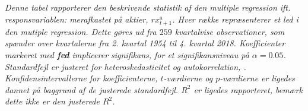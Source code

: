\documentclass[
  a4paper,
  oneside]{memoir}
\begin{document}
\begin{table}[H]
{\begin{threeparttable}
\begin{tabular}[t]{llrrrrrrrr}
\bottomrule
\end{tabular}
\begin{tablenotes}
\item \textit{Denne tabel rapporterer den beskrivende statistik af den multiple regression ift. responsvariablen: merafkastet på aktier, $rx_{t+1}^{\text{a}}$. Hver række repræsenterer et led i den mutiple regression. Dette gøres ud fra $259$ kvartalvise observationer, som spænder over kvartalerne fra 2. kvartal 1954 til 4. kvartal 2018. Koefficienter markeret med \textbf{fed} implicerer signifikans, for et signifikansniveau på $\alpha=0.05$. Standardfejl er justeret for heteroskedasticitet og autokorrelation, \citep{Newey1987}. Konfidensintervallerne for koefficienterne, $t$-værdierne og $p$-værdierne er ligedes dannet på baggrund af de justerede standardfejl. $R^2$ er ligedes rapporteret, bemærk dette ikke er den justerede $R^2$.}
\end{tablenotes}
\end{threeparttable}}
\end{table}
\end{document}
